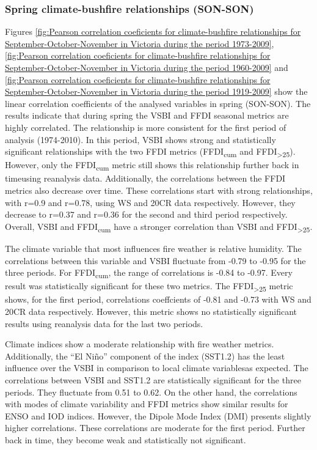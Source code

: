 \subsubsection{Spring climate-bushfire relationships (SON-SON)}

Figures \ref{fig:Pearson correlation coeficients for climate-bushfire relationships for September-October-November in Victoria during the period 1973-2009},
\ref{fig:Pearson correlation coeficients for climate-bushfire relationships for September-October-November in Victoria during the period 1960-2009}
and \ref{fig:Pearson correlation coeficients for climate-bushfire relationships for September-October-November in Victoria during the period 1919-2009}
show the linear correlation coefficients of the analysed variables
in spring (SON-SON). The results indicate that during spring the VSBI
and FFDI seasonal metrics are highly correlated. The relationship
is more consistent for the first period of analysis (1974-2010). In
this period, VSBI shows strong and statistically significant relationships
with the two FFDI metrics (FFDI\textsubscript{cum} and FFDI\textsubscript{>25}).
However, only the FFDI\textsubscript{cum} metric still shows this
relationship further back in time\textemdash using reanalysis data\textemdash .
Additionally, the correlations between the FFDI metrics also decrease
over time. These correlations start with strong relationships, with
r=0.9 and r=0.78, using WS and 20CR data respectively. However, they
decrease to r=0.37 and r=0.36 for the second and third period respectively.
Overall, VSBI and FFDI\textsubscript{cum} have a stronger correlation
than VSBI and FFDI\textsubscript{>25}. 

The climate variable that most influences fire weather is relative
humidity. The correlations between this variable and VSBI fluctuate
from -0.79 to -0.95 for the three periods. For FFDI\textsubscript{cum},
the range of correlations is -0.84 to -0.97. Every result was statistically
significant for these two metrics. The FFDI\textsubscript{>25} metric
shows, for the first period, correlations coeffcients of -0.81 and
-0.73 with WS and 20CR data respectively. However, this metric shows
no statistically significant results using reanalysis data for the
last two periods. 

Climate indices show a moderate relationship with fire weather metrics.
Additionally, the \textquotedblleft El Ni\~no\textquotedblright{} component
of the index (SST1.2) has the least influence over the VSBI in comparison
to local climate variables\textemdash as expected\textemdash . The
correlations between VSBI and SST1.2 are statistically significant
for the three periods. They fluctuate from 0.51 to 0.62. On the other
hand, the correlations with modes of climate variability and FFDI
metrics show similar results for ENSO and IOD indices. However, the
Dipole Mode Index (DMI) presents slightly higher correlations. These
correlations are moderate for the first period. Further back in time,
they become weak and statistically not significant. 

